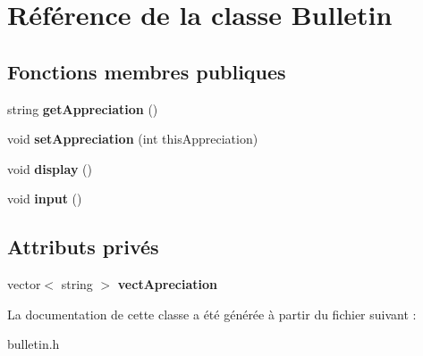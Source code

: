 \hypertarget{class_bulletin}{\section{Référence de la classe Bulletin}
\label{class_bulletin}
}
\subsection*{Fonctions membres publiques}
\begin{DoxyCompactItemize}
\item 
\hypertarget{class_bulletin_a205129b160a08aa026ac8d5f9b5fd4c8}{string {\bfseries get\+Appreciation} ()}\label{class_bulletin_a205129b160a08aa026ac8d5f9b5fd4c8}

\item 
\hypertarget{class_bulletin_a8c80b89f22792e5706e6276f882daf44}{void {\bfseries set\+Appreciation} (int this\+Appreciation)}\label{class_bulletin_a8c80b89f22792e5706e6276f882daf44}

\item 
\hypertarget{class_bulletin_a9c98ddfef1e472439bccf90a68431527}{void {\bfseries display} ()}\label{class_bulletin_a9c98ddfef1e472439bccf90a68431527}

\item 
\hypertarget{class_bulletin_aa417e7a45dd7f6d216e97d516345feaf}{void {\bfseries input} ()}\label{class_bulletin_aa417e7a45dd7f6d216e97d516345feaf}

\end{DoxyCompactItemize}
\subsection*{Attributs privés}
\begin{DoxyCompactItemize}
\item 
\hypertarget{class_bulletin_a41e708509d0a07b16fada453da8cc01f}{vector$<$ string $>$ {\bfseries vect\+Apreciation}}\label{class_bulletin_a41e708509d0a07b16fada453da8cc01f}

\end{DoxyCompactItemize}


La documentation de cette classe a été générée à partir du fichier suivant \+:\begin{DoxyCompactItemize}
\item 
bulletin.\+h\end{DoxyCompactItemize}
